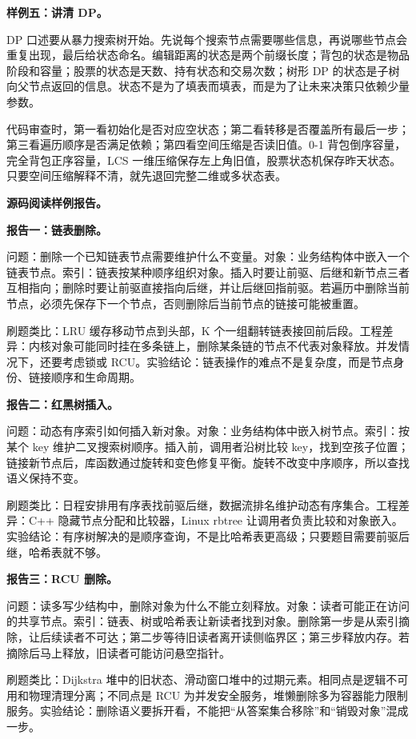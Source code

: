 \noindent\textbf{样例五：讲清 DP。}

DP 口述要从暴力搜索树开始。先说每个搜索节点需要哪些信息，再说哪些节点会重复出现，最后给状态命名。编辑距离的状态是两个前缀长度；背包的状态是物品阶段和容量；股票的状态是天数、持有状态和交易次数；树形 DP 的状态是子树向父节点返回的信息。状态不是为了填表而填表，而是为了让未来决策只依赖少量参数。

代码审查时，第一看初始化是否对应空状态；第二看转移是否覆盖所有最后一步；第三看遍历顺序是否满足依赖；第四看空间压缩是否读旧值。0-1 背包倒序容量，完全背包正序容量，LCS 一维压缩保存左上角旧值，股票状态机保存昨天状态。只要空间压缩解释不清，就先退回完整二维或多状态表。

\noindent\textbf{源码阅读样例报告。}

\noindent\textbf{报告一：链表删除。}

问题：删除一个已知链表节点需要维护什么不变量。对象：业务结构体中嵌入一个链表节点。索引：链表按某种顺序组织对象。插入时要让前驱、后继和新节点三者互相指向；删除时要让前驱直接指向后继，并让后继回指前驱。若遍历中删除当前节点，必须先保存下一个节点，否则删除后当前节点的链接可能被重置。

刷题类比：LRU 缓存移动节点到头部，K 个一组翻转链表接回前后段。工程差异：内核对象可能同时挂在多条链上，删除某条链的节点不代表对象释放。并发情况下，还要考虑锁或 RCU。实验结论：链表操作的难点不是复杂度，而是节点身份、链接顺序和生命周期。

\noindent\textbf{报告二：红黑树插入。}

问题：动态有序索引如何插入新对象。对象：业务结构体中嵌入树节点。索引：按某个 key 维护二叉搜索树顺序。插入前，调用者沿树比较 key，找到空孩子位置；链接新节点后，库函数通过旋转和变色修复平衡。旋转不改变中序顺序，所以查找语义保持不变。

刷题类比：日程安排用有序表找前驱后继，数据流排名维护动态有序集合。工程差异：C++  隐藏节点分配和比较器，Linux rbtree 让调用者负责比较和对象嵌入。实验结论：有序树解决的是顺序查询，不是比哈希表更高级；只要题目需要前驱后继，哈希表就不够。

\noindent\textbf{报告三：RCU 删除。}

问题：读多写少结构中，删除对象为什么不能立刻释放。对象：读者可能正在访问的共享节点。索引：链表、树或哈希表让新读者找到对象。删除第一步是从索引摘除，让后续读者不可达；第二步等待旧读者离开读侧临界区；第三步释放内存。若摘除后马上释放，旧读者可能访问悬空指针。

刷题类比：Dijkstra 堆中的旧状态、滑动窗口堆中的过期元素。相同点是逻辑不可用和物理清理分离；不同点是 RCU 为并发安全服务，堆懒删除多为容器能力限制服务。实验结论：删除语义要拆开看，不能把“从答案集合移除”和“销毁对象”混成一步。


